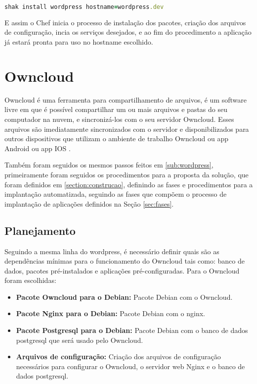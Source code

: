 \begin{lstlisting}[language=Ruby,label=dice_index,caption={Exemplo de exexução de instalação do wordpress com shak}]
shak install wordpress hostname=wordpress.dev
\end{lstlisting}

E assim o Chef inicia o processo de instalação dos pacotes, criação dos arquivos
de configuração, incia os serviços desejados, e ao fim do procedimento a aplicação
já estará pronta para uso no hostname escolhido.

\section{Owncloud}
\label{sub:owncloud}

Owncloud é uma ferramenta para compartilhamento de arquivos, é um software 
livre em que é possível compartilhar
um ou mais arquivos e pastas do seu computador na nuvem, e sincronizá-los com o seu
servidor Owncloud. Esses arquivos são imediatamente sincronizados com o servidor
e disponibilizados para outros dispositivos que utilizam o ambiente de trabalho
Owncloud ou app Android ou app IOS \cite{owncloud} .

Também foram seguidos os mesmos passos feitos em \ref{sub:wordpress}, primeiramente
foram seguidos os procedimentos para a proposta da solução, que foram definidos em \ref{section:construcao},
definindo as fases e procedimentos para a implantação automatizada, seguindo as
fases que compõem o processo de implantação de aplicações definidos na Seção
\ref{sec:fases}.

\subsection{Planejamento}

Seguindo a mesma linha do wordpress, é necessário definir quais são as dependências
mínimas para o funcionamento do Owncloud tais como: banco de dados, pacotes
pré-instalados e aplicações pré-configuradas. Para o Owncloud foram escolhidas:

\begin{itemize}
   \item \textbf{Pacote Owncloud para o Debian:} Pacote Debian com o Owncloud.
   \item \textbf{Pacote Nginx para o Debian:} Pacote Debian com o nginx.
   \item \textbf{Pacote Postgresql para o Debian:} Pacote Debian com o banco de dados postgresql
   que será usado pelo Owncloud.
   \item \textbf{Arquivos de configuração:} Criação dos arquivos de configuração
   necessários para configurar o Owncloud, o servidor web Nginx e o banco de dados
   postgresql.
\end{itemize}

